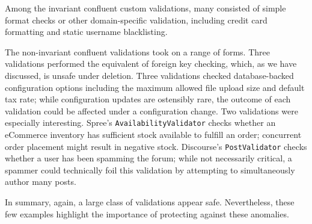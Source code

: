 Among the invariant confluent custom validations, many consisted of
simple format checks or other domain-specific validation, including
credit card formatting and static username blacklisting.

The non-invariant confluent validations took on a range of
forms. Three validations performed the equivalent of foreign key
checking, which, as we have discussed, is unsafe under deletion. Three
validations checked database-backed configuration options including
the maximum allowed file upload size and default tax rate; while
configuration updates are ostensibly rare, the outcome of each
validation could be affected under a configuration change. Two
validations were especially interesting. Spree's
\texttt{AvailabilityValidator} checks whether an eCommerce inventory
has sufficient stock available to fulfill an order; concurrent order
placement might result in negative stock. Discourse's
\texttt{PostValidator} checks whether a user has been spamming the
forum; while not necessarily critical, a spammer could technically
foil this validation by attempting to simultaneously author many posts.

In summary, again, a large class of validations appear safe. Nevertheless,
these few examples highlight the importance of protecting against
these anomalies. 


